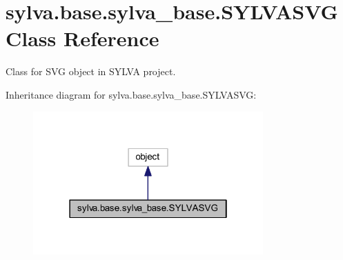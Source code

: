 \hypertarget{classsylva_1_1base_1_1sylva__base_1_1_s_y_l_v_a_s_v_g}{}\section{sylva.\+base.\+sylva\+\_\+base.\+S\+Y\+L\+V\+A\+S\+VG Class Reference}
\label{classsylva_1_1base_1_1sylva__base_1_1_s_y_l_v_a_s_v_g}


Class for S\+VG object in S\+Y\+L\+VA project.  




Inheritance diagram for sylva.\+base.\+sylva\+\_\+base.\+S\+Y\+L\+V\+A\+S\+VG\+:\nopagebreak
\begin{figure}[H]
\begin{center}
\leavevmode
\includegraphics[width=250pt]{classsylva_1_1base_1_1sylva__base_1_1_s_y_l_v_a_s_v_g__inherit__graph}
\end{center}
\end{figure}
